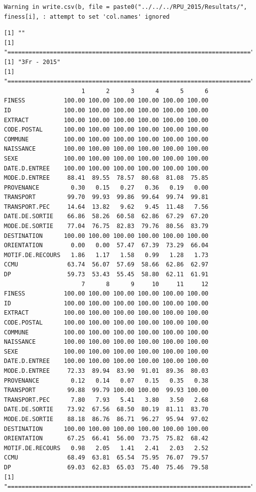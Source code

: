 \documentclass[]{article}
\begin{document}
\begin{verbatim}
Warning in write.csv(b, file = paste0("../../../RPU_2015/Resultats/",
finess[i], : attempt to set 'col.names' ignored
\end{verbatim}

\begin{verbatim}
[1] ""
[1] "====================================================================="
[1] "3Fr - 2015"
[1] "====================================================================="
                      1      2      3      4      5      6
FINESS           100.00 100.00 100.00 100.00 100.00 100.00
ID               100.00 100.00 100.00 100.00 100.00 100.00
EXTRACT          100.00 100.00 100.00 100.00 100.00 100.00
CODE.POSTAL      100.00 100.00 100.00 100.00 100.00 100.00
COMMUNE          100.00 100.00 100.00 100.00 100.00 100.00
NAISSANCE        100.00 100.00 100.00 100.00 100.00 100.00
SEXE             100.00 100.00 100.00 100.00 100.00 100.00
DATE.D.ENTREE    100.00 100.00 100.00 100.00 100.00 100.00
MODE.D.ENTREE     88.41  89.55  78.57  80.68  81.08  75.85
PROVENANCE         0.30   0.15   0.27   0.36   0.19   0.00
TRANSPORT         99.70  99.93  99.86  99.64  99.74  99.81
TRANSPORT.PEC     14.64  13.82   9.62   9.45  11.48   7.56
DATE.DE.SORTIE    66.86  58.26  60.58  62.86  67.29  67.20
MODE.DE.SORTIE    77.04  76.75  82.83  79.76  80.56  83.79
DESTINATION      100.00 100.00 100.00 100.00 100.00 100.00
ORIENTATION        0.00   0.00  57.47  67.39  73.29  66.04
MOTIF.DE.RECOURS   1.86   1.17   1.58   0.99   1.28   1.73
CCMU              63.74  56.07  57.69  58.66  62.86  62.97
DP                59.73  53.43  55.45  58.80  62.11  61.91
                      7      8      9     10     11     12
FINESS           100.00 100.00 100.00 100.00 100.00 100.00
ID               100.00 100.00 100.00 100.00 100.00 100.00
EXTRACT          100.00 100.00 100.00 100.00 100.00 100.00
CODE.POSTAL      100.00 100.00 100.00 100.00 100.00 100.00
COMMUNE          100.00 100.00 100.00 100.00 100.00 100.00
NAISSANCE        100.00 100.00 100.00 100.00 100.00 100.00
SEXE             100.00 100.00 100.00 100.00 100.00 100.00
DATE.D.ENTREE    100.00 100.00 100.00 100.00 100.00 100.00
MODE.D.ENTREE     72.33  89.94  83.90  91.01  89.36  80.03
PROVENANCE         0.12   0.14   0.07   0.15   0.35   0.38
TRANSPORT         99.88  99.79 100.00 100.00  99.93 100.00
TRANSPORT.PEC      7.80   7.93   5.41   3.80   3.50   2.68
DATE.DE.SORTIE    73.92  67.56  68.50  80.19  81.11  83.70
MODE.DE.SORTIE    88.18  86.76  86.71  96.27  95.94  97.02
DESTINATION      100.00 100.00 100.00 100.00 100.00 100.00
ORIENTATION       67.25  66.41  56.00  73.75  75.82  68.42
MOTIF.DE.RECOURS   0.98   2.05   1.41   2.41   2.03   2.52
CCMU              68.49  63.81  65.54  75.95  76.07  79.57
DP                69.03  62.83  65.03  75.40  75.46  79.58
[1] "====================================================================="
\end{verbatim}
\end{document}
